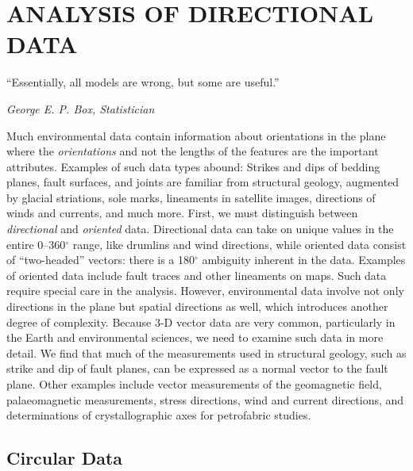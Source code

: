 %
\chapter{ANALYSIS OF DIRECTIONAL DATA}
\label{ch:directional}
\epigraph{``Essentially, all models are wrong, but some are useful.''}{\textit{George E. P. Box, Statistician}}

	Much environmental data contain information about orientations in the plane where the \emph{orientations} 
and not the lengths of the features are the important attributes.  Examples of such data types abound: Strikes and dips 
of bedding planes, fault surfaces, and joints are familiar from structural geology, augmented by glacial striations, sole marks, 
lineaments in satellite images, directions of winds and currents, and much more.  First, we must distinguish between 
\emph{directional} and \emph{oriented} data.  Directional data can take on unique values in the entire 0--360$^{\circ}$ 
range, like drumlins and wind directions, while oriented data consist of ``two-headed'' vectors: there is a 180$^{\circ}$ 
 ambiguity 
inherent in the data.  Examples of oriented data include fault traces and other lineaments on maps.  
Such data require special care in the analysis.
	However, environmental data involve not only directions in the plane but spatial directions as well, which  
introduces another degree of complexity.  Because 3-D vector data are very common, particularly in 
the Earth and environmental sciences, we need to examine such data in more detail.  We find that much of the 
measurements used in structural geology, such as strike and dip of fault planes, can be expressed
as a normal vector to the fault plane.  Other examples include vector measurements of the 
geomagnetic field, palaeomagnetic measurements, stress directions, wind and current directions, and determinations of 
crystallographic axes for petrofabric studies.


\section{Circular Data}
